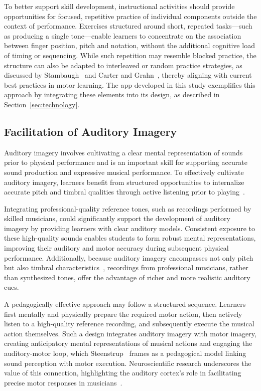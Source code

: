 \documentclass[runningheads]{llncs}
\begin{document}
To better support skill development, instructional activities should provide opportunities for focused, repetitive practice of individual components outside the context of performance. Exercises structured around short, repeated tasks---such as producing a single tone---enable learners to concentrate on the association between finger position, pitch and notation, without the additional cognitive load of timing or sequencing. While such repetition may resemble blocked practice, the structure can also be adapted to interleaved or random practice strategies, as discussed by Stambaugh~\cite{Stambaugh11} and Carter and Grahn~\cite{Carter16}, thereby aligning with current best practices in motor learning. The app developed in this study exemplifies this approach by integrating these elements into its design, as described in Section~\ref{sec:technology}.

\subsection{Facilitation of Auditory Imagery}

Auditory imagery involves cultivating a clear mental representation of sounds prior to physical performance and is an important skill for supporting accurate sound production and expressive musical performance. To effectively cultivate auditory imagery, learners benefit from structured opportunities to internalize accurate pitch and timbral qualities through active listening prior to playing~\cite{Brown13}.

Integrating professional-quality reference tones, such as recordings performed by skilled musicians, could significantly support the development of auditory imagery by providing learners with clear auditory models. Consistent exposure to these high-quality sounds enables students to form robust mental representations, improving their auditory and motor accuracy during subsequent physical performance. Additionally, because auditory imagery encompasses not only pitch but also timbral characteristics~\cite{Halpern04}, recordings from professional musicians, rather than synthesized tones, offer the advantage of richer and more realistic auditory cues.

A pedagogically effective approach may follow a structured sequence. Learners first mentally and physically prepare the required motor action, then actively listen to a high-quality reference recording, and subsequently execute the musical action themselves. Such a design integrates auditory imagery with motor imagery, creating anticipatory mental representations of musical actions and engaging the auditory-motor loop, which Steenstrup~\cite{Steen23} frames as a pedagogical model linking sound perception with motor execution. Neuroscientific research underscores the value of this connection, highlighting the auditory cortex’s role in facilitating precise motor responses in musicians~\cite{Zatorre05,Gates21}.
\end{document}

